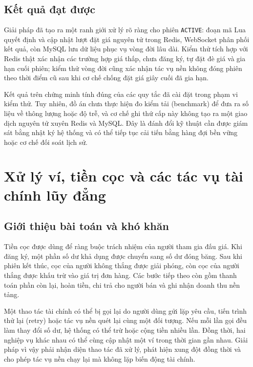 \documentclass[../DoAn.tex]{subfiles}
\begin{document}
\subsection{Kết quả đạt được}

Giải pháp đã tạo ra một ranh giới xử lý rõ ràng cho phiên \texttt{ACTIVE}: đoạn mã Lua quyết định và cập nhật lượt đặt giá nguyên tử trong Redis, WebSocket phân phối kết quả, còn MySQL lưu dữ liệu phục vụ vòng đời lâu dài. Kiểm thử tích hợp với Redis thật xác nhận các trường hợp giá thấp, chưa đăng ký, tự đặt đè giá và gia hạn cuối phiên; kiểm thử vòng đời cũng xác nhận tác vụ nền không đóng phiên theo thời điểm cũ sau khi cơ chế chống đặt giá giây cuối đã gia hạn.

Kết quả trên chứng minh tính đúng của các quy tắc đã cài đặt trong phạm vi kiểm thử. Tuy nhiên, đồ án chưa thực hiện đo kiểm tải (benchmark) để đưa ra số liệu về thông lượng hoặc độ trễ, và cơ chế ghi thứ cấp này không tạo ra một giao dịch nguyên tử xuyên Redis và MySQL. Đây là đánh đổi kỹ thuật cần được giám sát bằng nhật ký hệ thống và có thể tiếp tục cải tiến bằng hàng đợi bền vững hoặc cơ chế đối soát lịch sử.

\section{Xử lý ví, tiền cọc và các tác vụ tài chính lũy đẳng}
\label{sec:deposit-settlement-idempotency}

\subsection{Giới thiệu bài toán và khó khăn}

Tiền cọc được dùng để ràng buộc trách nhiệm của người tham gia đấu giá. Khi đăng ký, một phần số dư khả dụng được chuyển sang số dư đóng băng. Sau khi phiên kết thúc, cọc của người không thắng được giải phóng, còn cọc của người thắng được khấu trừ vào giá trị đơn hàng. Các bước tiếp theo còn gồm thanh toán phần còn lại, hoàn tiền, chi trả cho người bán và ghi nhận doanh thu nền tảng.

Một thao tác tài chính có thể bị gọi lại do người dùng gửi lặp yêu cầu, tiến trình thử lại (retry) hoặc tác vụ nền quét lại cùng một đối tượng. Nếu mỗi lần gọi đều làm thay đổi số dư, hệ thống có thể trừ hoặc cộng tiền nhiều lần. Đồng thời, hai nghiệp vụ khác nhau có thể cùng cập nhật một ví trong thời gian gần nhau. Giải pháp vì vậy phải nhận diện thao tác đã xử lý, phát hiện xung đột đồng thời và cho phép tác vụ nền chạy lại mà không lặp biến động tài chính.
\end{document}
